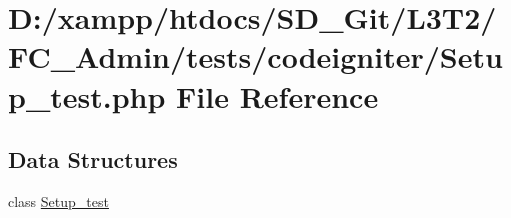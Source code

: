 \hypertarget{_setup__test_8php}{}\section{D\+:/xampp/htdocs/\+S\+D\+\_\+\+Git/\+L3\+T2/\+F\+C\+\_\+\+Admin/tests/codeigniter/\+Setup\+\_\+test.php File Reference}
\label{_setup__test_8php}
\subsection*{Data Structures}
\begin{DoxyCompactItemize}
\item 
class \hyperlink{class_setup__test}{Setup\+\_\+test}
\end{DoxyCompactItemize}
